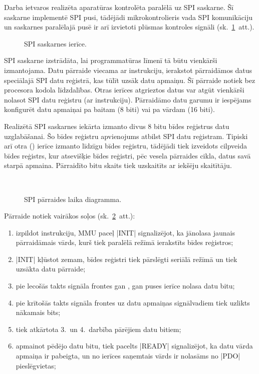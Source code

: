 		Darba ietvaros realizēta aparatūras kontrolēta paralēlā uz SPI saskarne.
		Šī saskarne implementē SPI  pusi, tādējādi mikrokontrolieris
		vada SPI komunikāciju un saskarnes paralēlajā pusē ir arī izvietoti
		plūsmas kontroles signāli (sk.~\ref{fig:spi}~att.).
		
		\begin{figure}[thp]
			\centering
			\def\svgscale{1.25}
			{\ttfamily\scriptsize}
			\caption{SPI saskarnes ierīce.}
			\label{fig:spi}
		\end{figure}
		
		SPI saskarne izstrādāta, lai programmatūras līmenī tā būtu vienkārši
		izmantojama. Datu pārraide viecama ar  instrukciju, ierakstot
		pārraidāmos datus speciālajā SPI datu reģistrā, kas tūlīt uzsāk datu
		apmaiņu. Šī pārraide notiek bez procesora kodola līdzdalības.
		Otras ierīces atgrieztos datus var atgūt vienkārši nolasot
		SPI datu reģistru (ar  instrukciju). Pārraidāmo datu garumu
		ir iespējams konfigurēt datu apmaiņai pa baitam (8 biti) vai
		pa vārdam (16 biti).
		
		Realizētā SPI saskarnes iekārta izmanto divus 8 bitu bīdes reģistrus
		datu uzglabāšanai. Šo bīdes reģistru apvienojums atbilst SPI datu reģistram.
		Tipiski arī otra ()
		ierīce izmanto līdzīgu bīdes reģistru, tādējādi tiek izveidots cilpveida
		bīdes reģistrs, kur atsevišķie bīdes reģistri, pēc vesela pārraides cikla,
		datus savā starpā apmaina. Pārraidīto bitu skaits tiek uzskaitīts
		ar iekšēju skaitītāju. 
		\begin{figure}[th]
			\centering
			\def\svgwidth{\textwidth}
			{\ttfamily\footnotesize}\\
			\caption{SPI pārraides laika diagramma.}
			\label{fig:spi-tx}
		\end{figure}
		Pārraide notiek vairākos soļos
		(sk.~\ref{fig:spi-tx}~att.):
		\begin{enumerate}
			\item izpildot  instrukciju, MMU paceļ |INIT|
				signalizējot, ka jānolasa jaunais pārraidāmais vārds, kurš
				tiek paralēlā režīmā ierakstīts bīdes reģistros;
			\item |INIT| kļūstot zemam, bīdes reģistri tiek pārslēgti
				seriālā režīmā un tiek uzsākta datu pārraide;
			\item pie lecošās takts signāla frontes gan ,
				gan  puses ierīce nolasa datu bitu;
			\item pie krītošās takts signāla frontes uz datu apmaiņas
				signālvadiem tiek uzlikts nākamais bits;
			\item tiek atkārtota 3.~un 4.~darbība pārējiem datu bitiem;
			\item apmainot pēdējo datu bitu, tiek pacelts |READY|
				signalizējot, ka datu vārda apmaiņa ir pabeigta, un no
				 ierīces
				saņemtais vārds ir nolasāms no |PDO| pieslēgvietas;
		\end{enumerate}
		
